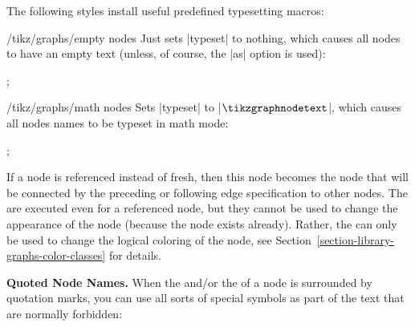 \begin{itemize}
  The following styles install useful predefined typesetting macros:
  \begin{key}{/tikz/graphs/empty nodes}
    Just sets |typeset| to nothing, which causes all nodes to have an
    empty text (unless, of course, the |as| option is used):
    \begin{codeexample}[]
\tikz {};  
    \end{codeexample}
  \end{key}
  \begin{key}{/tikz/graphs/math nodes}
    Sets |typeset| to |$\tikzgraphnodetext$|, which causes all nodes
    names to be typeset in math mode:
    \begin{codeexample}[]
\tikz {};  
    \end{codeexample}
  \end{key}
\end{itemize}

If a node is referenced instead of fresh, then this node becomes the
node that will be connected by the preceding or following edge
specification to other 
nodes. The  are executed even for a referenced node, but
they cannot be used to change the appearance of the node (because the
node exists already). Rather, the  can only be used to
change the logical coloring of the node, see
Section~\ref{section-library-graphs-color-classes} for details.

\medskip
\textbf{Quoted Node Names.} When the  and/or the
 of a node is surrounded by quotation marks, you can use
all sorts of special symbols as part of the text that are
normally forbidden:
\begin{codeexample}[]
\end{codeexample}

